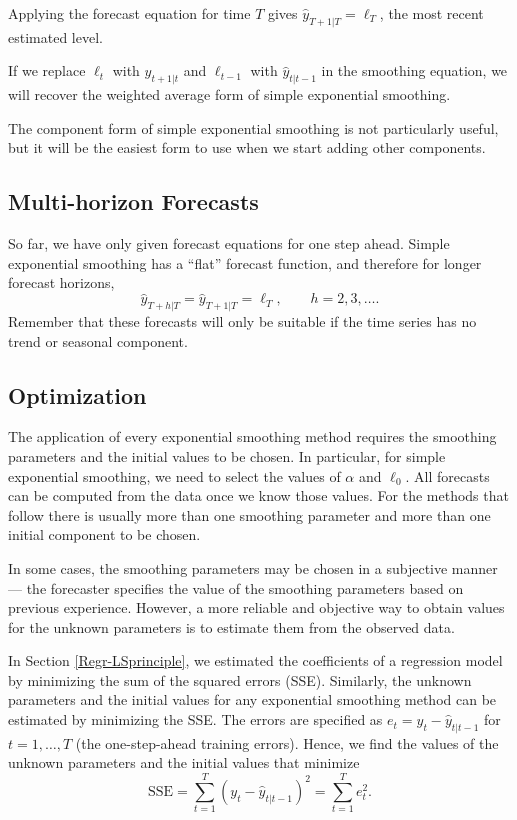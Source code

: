 \documentclass[]{book}
\begin{document}
Applying the forecast equation for time \(T\) gives \(\hat{y}_{T+1|T} = \ell_{T}\), the most recent estimated level.

If we replace \(\ell_t\) with \(\hat{y}_{t+1|t}\) and \(\ell_{t-1}\) with \(\hat{y}_{t|t-1}\) in the smoothing equation, we will recover the weighted average form of simple exponential smoothing.

The component form of simple exponential smoothing is not particularly useful, but it will be the easiest form to use when we start adding other components.

\hypertarget{multi-horizon-forecasts}{%
\subsection*{Multi-horizon Forecasts}\label{multi-horizon-forecasts}}

So far, we have only given forecast equations for one step ahead. Simple exponential smoothing has a ``flat'' forecast function, and therefore for longer forecast horizons,
\[
 \hat{y}_{T+h|T} = \hat{y}_{T+1|T}=\ell_T, \qquad h=2,3,\dots.
\]
Remember that these forecasts will only be suitable if the time series has no trend or seasonal component.

\hypertarget{optimization}{%
\subsection*{Optimization}\label{optimization}}

The application of every exponential smoothing method requires the smoothing parameters and the initial values to be chosen. In particular, for simple exponential smoothing, we need to select the values of \(\alpha\) and \(\ell_0\). All forecasts can be computed from the data once we know those values. For the methods that follow there is usually more than one smoothing parameter and more than one initial component to be chosen.

In some cases, the smoothing parameters may be chosen in a subjective manner --- the forecaster specifies the value of the smoothing parameters based on previous experience. However, a more reliable and objective way to obtain values for the unknown parameters is to estimate them from the observed data.

In Section \ref{Regr-LSprinciple}, we estimated the coefficients of a regression model by minimizing the sum of the squared errors (SSE). Similarly, the unknown parameters and the initial values for any exponential smoothing method can be estimated by minimizing the SSE. The errors are specified as \(e_t=y_t - \hat{y}_{t|t-1}\) for \(t=1,\dots,T\) (the one-step-ahead training errors). Hence, we find the values of the unknown parameters and the initial values that minimize
\begin{equation}
 \text{SSE}=\sum_{t=1}^T(y_t - \hat{y}_{t|t-1})^2=\sum_{t=1}^Te_t^2. \label{eq:7-SSE}
\end{equation}
\end{document}
